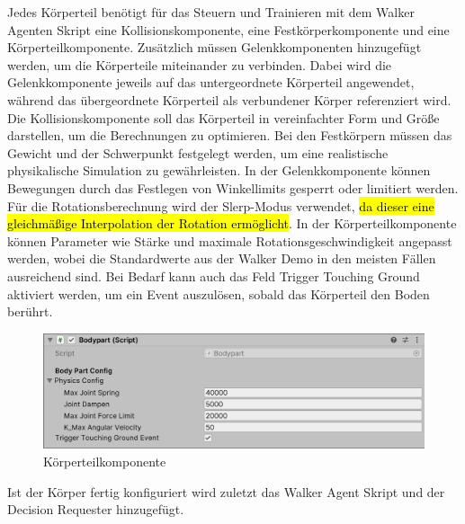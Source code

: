 Jedes Körperteil benötigt für das Steuern und Trainieren mit dem Walker Agenten Skript eine Kollisionskomponente, eine Festkörperkomponente und eine Körperteilkomponente. Zusätzlich müssen Gelenkkomponenten hinzugefügt werden, um die Körperteile miteinander zu verbinden. Dabei wird die Gelenkkomponente jeweils auf das untergeordnete Körperteil angewendet, während das übergeordnete Körperteil als verbundener Körper referenziert wird. Die Kollisionskomponente soll das Körperteil in vereinfachter Form und Größe darstellen, um die Berechnungen zu optimieren. Bei den Festkörpern müssen das Gewicht und der Schwerpunkt festgelegt werden, um eine realistische physikalische Simulation zu gewährleisten. In der Gelenkkomponente können Bewegungen durch das Festlegen von Winkellimits gesperrt oder limitiert werden. Für die Rotationsberechnung wird der Slerp-Modus verwendet, \hl{da dieser eine gleichmäßige Interpolation der Rotation ermöglicht}. In der Körperteilkomponente können Parameter wie Stärke und maximale Rotationsgeschwindigkeit angepasst werden, wobei die Standardwerte aus der Walker Demo in den meisten Fällen ausreichend sind. Bei Bedarf kann auch das Feld \grqq{}Trigger Touching Ground\grqq{} aktiviert werden, um ein Event auszulösen, sobald das Körperteil den Boden berührt.

\begin{figure}[H]
  \centering  
  \includegraphics[scale=0.5]{img/komponente_bodypart}
  \caption{Körperteilkomponente}
  \label{fig:komponente_bodypart}
\end{figure}


Ist der Körper fertig konfiguriert wird zuletzt das Walker Agent Skript und der Decision Requester hinzugefügt.

